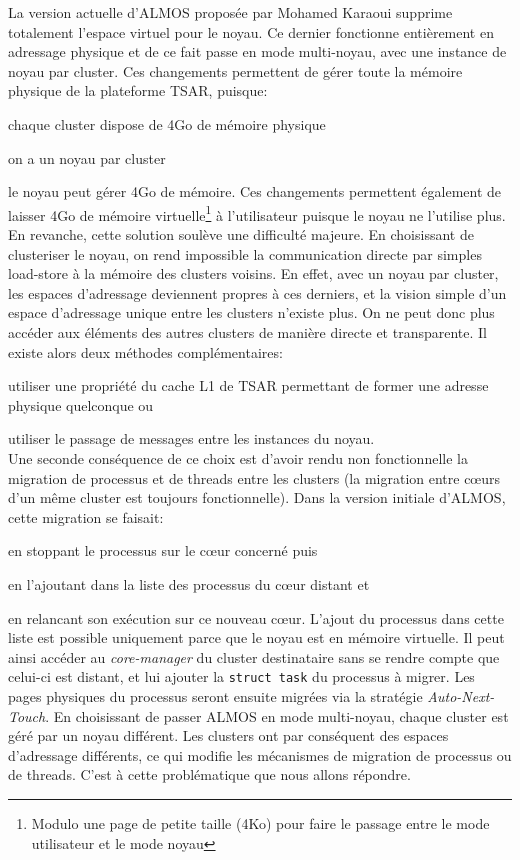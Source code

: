     La version actuelle d'ALMOS proposée par Mohamed Karaoui supprime totalement
    l'espace virtuel pour le noyau. Ce dernier fonctionne entièrement en
    adressage physique et de ce fait passe en mode multi-noyau, avec une
    instance de noyau par cluster. Ces changements permettent de gérer toute la
    mémoire physique de la plateforme TSAR, puisque:\benumline \item chaque
    cluster dispose de 4Go de mémoire physique \item on a un noyau par
    cluster \item le noyau peut gérer 4Go de mémoire\eenumline. Ces changements
    permettent également de laisser 4Go de mémoire virtuelle\footnote{Modulo une
      page de petite taille (4Ko) pour faire le passage entre le mode
      utilisateur et le mode noyau} à l'utilisateur puisque le noyau ne
    l'utilise plus.\\

    En revanche, cette solution soulève une difficulté majeure. En choisissant
    de clusteriser le noyau, on rend impossible la communication directe par
    simples load-store à la mémoire des clusters voisins. En effet, avec un
    noyau par cluster, les espaces d'adressage deviennent propres à ces
    derniers, et la vision simple d'un espace d'adressage unique entre les
    clusters n'existe plus. On ne peut donc plus accéder aux éléments des autres
    clusters de manière directe et transparente. Il existe alors deux méthodes
    complémentaires:\benumline \item utiliser une propriété du cache L1 de TSAR
    permettant de former une adresse physique quelconque ou \item utiliser le
    passage de messages entre les instances du noyau\eenumline.\\

    Une seconde conséquence de ce choix est d'avoir rendu non fonctionnelle la
    migration de processus et de threads entre les clusters (la migration entre
    c\oe urs d'un même cluster est toujours fonctionnelle). Dans la version
    initiale d'ALMOS, cette migration se faisait:\benumline \item en stoppant le
    processus sur le c\oe ur concerné puis \item en l'ajoutant dans la liste des
    processus du c\oe ur distant et \item en relancant son exécution sur ce
    nouveau c\oe ur\eenumline. L'ajout du processus dans cette liste est
    possible uniquement parce que le noyau est en mémoire virtuelle. Il peut
    ainsi accéder au \textit{core-manager} du cluster destinataire sans se
    rendre compte que celui-ci est distant, et lui ajouter la \texttt{struct
      task} du processus à migrer. Les pages physiques du processus seront
    ensuite migrées via la stratégie \textit{Auto-Next-Touch}. En choisissant de
    passer ALMOS en mode multi-noyau, chaque cluster est géré par un noyau
    différent. Les clusters ont par conséquent des espaces d'adressage
    différents, ce qui modifie les mécanismes de migration de processus ou de
    threads. C'est à cette problématique que nous allons répondre.


